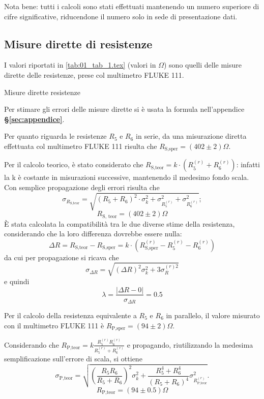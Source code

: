 Nota bene: tutti i calcoli sono stati effettuati mantenendo un numero superiore di cifre significative, riducendone il numero solo in sede di presentazione dati.

\subsection{Misure dirette di resistenze}
I valori riportati in \autoref{tab:01_tab_1.tex} (valori in $\Omega$) sono quelli delle misure dirette delle resistenze, prese col multimetro FLUKE 111.

\begin{tabella}
	\centering
	
	\caption{Misure dirette resistenze}
	\label{tab:01_tab_1.tex}
\end{tabella}


Per stimare gli errori delle misure dirette si \`e usata la formula nell'appendice \textbf{\S\ref{sec:appendice}}.


Per quanto riguarda le resistenze $R_5$ e $R_6$ in serie, da una misurazione diretta effettuata col multimetro FLUKE 111 risulta che $R_{\textrm{S,sper}}= (402 \pm 2 )\Omega$. 

Per il calcolo teorico, \`e stato considerato che $R_{\textrm{S,teor}}=k\cdot(R_5^{(r)} + R_6^{(r)})$: infatti la k \`e costante in misurazioni successive, mantenendo il medesimo fondo scala. Con semplice propagazione degli errori risulta che 
\[\sigma_{R_{\textrm{S,teor}}}=\sqrt{(R_5+R_6)^2\cdot\sigma_k^2+\sigma_{R_5^{(r)}}^2+\sigma_{R_6^{(r)}}^2};\]
\[R_{\textrm{S, teor}}=(402 \pm 2 )\Omega\]
\`E stata calcolata la compatibilit\`a tra le due diverse stime della resistenza, considerando che la loro differenza dovrebbe essere nulla:
\[\Delta R = R_{\textrm{S,teor}} - {R_{\textrm{S,sper}}}= k\cdot(R_{\textrm{S,sper}}^{(r)}-R_5^{(r)}-R_6^{(r)})\]
da cui per propagazione si ricava che 
\[ \sigma_{\Delta R} = 
        \sqrt{ (\Delta R)^2 \sigma_k^2 + 3 \sigma_R^{(r) 2} }\]
e quindi
\[\lambda=\frac{\left|\Delta R - 0\right|}{\sigma_{\Delta R}}=0.5\]





Per il calcolo della resistenza equivalente a $R_5$ e $R_6$ in parallelo, il valore misurato con il multimetro FLUKE 111 \`e $R_{\textrm{P,sper}}= (94 \pm 2) \Omega$.

Considerando che $R_{\textrm{P,teor}}=k  \frac{R_5^{(r)} R_6^{(r)}}{R_5^{(r)} + R_6^{(r)}}$ e propagando, riutilizzando la medesima semplificazione sull'errore di scala, si ottiene 
\[\sigma_{\textrm{P,teor}}=\sqrt{\left(\frac{R_5 R_6}{R_5+R_6}\right)^2 \sigma_k^2 + \frac{R_5^4 + R_6^4}{(R_5 + R_6)^4}  \sigma_{R_{\textrm{P,teor}}^{(r)}}^2} .\]
\[R_{\textrm{P,teor}}=(94 \pm 0.5) \Omega\]

